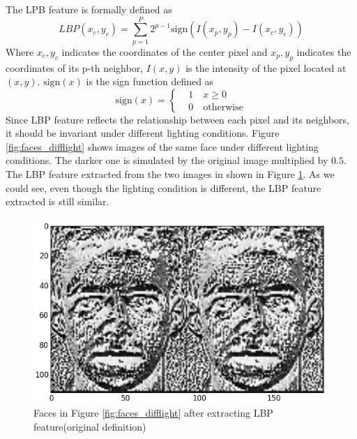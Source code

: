 \documentclass[paper=a4, fontsize=11pt]{scrartcl} %
\numberwithin{equation}{section} %
\numberwithin{figure}{section} %
\numberwithin{table}{section} %
\begin{document}
The LPB feature is formally defined as 
$$LBP(x_c, y_c) = \sum_{p = 1}^{P}2^{p-1}\text{sign}\left(I(x_p, y_p) - I(x_c, y_c)\right)$$
Where $x_c, y_c$ indicates the coordinates of the center pixel and $x_p, y_p$ indicates the coordinates of its p-th neighbor, $I(x, y)$ is the intensity of the pixel located at $(x, y)$. $\text{sign}(x)$ is the sign function defined as
$$
\text{sign}(x)=\left\{
	\begin{aligned}
	&1 \quad x\geq 0\\
	&0 \quad \text{otherwise}
	\end{aligned}
	\right.
$$
Since LBP feature reflects the relationship between each pixel and its neighbors, it should be invariant under different lighting conditions.  Figure \ref{fig:faces_difflight} shows images of the same face under different lighting conditions. The darker one is simulated by the original image multiplied by $0.5$.  The LBP feature extracted from the two images in shown in Figure \ref{fig:faces_difflight_lbp}. As we could see, even though the lighting condition is different, the LBP feature extracted is still similar.

\begin{figure}[htbp]
	\centering
	\includegraphics[width=5in]{faces_difflight_lbp.png}
	\caption{Faces in Figure \ref{fig:faces_difflight} after extracting LBP feature(original definition)}
	\label{fig:faces_difflight_lbp}
\end{figure}
\end{document}
